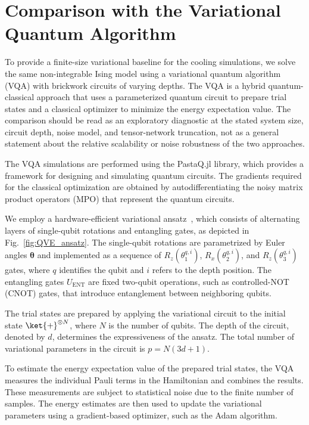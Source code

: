 \section{Comparison with the Variational Quantum Algorithm}

To provide a finite-size variational baseline for the cooling simulations, we solve the same non-integrable Ising model using a variational quantum algorithm (VQA) with brickwork circuits of varying depths. The VQA is a hybrid quantum-classical approach that uses a parameterized quantum circuit to prepare trial states and a classical optimizer to minimize the energy expectation value. The comparison should be read as an exploratory diagnostic at the stated system size, circuit depth, noise model, and tensor-network truncation, not as a general statement about the relative scalability or noise robustness of the two approaches.

The VQA simulations are performed using the PastaQ.jl library, which provides a framework for designing and simulating quantum circuits. The gradients required for the classical optimization are obtained by autodifferentiating the noisy matrix product operators (MPO) that represent the quantum circuits.

We employ a hardware-efficient variational ansatz~\citep{Kandala2017Hardwareefficient}, which consists of alternating layers of single-qubit rotations and entangling gates, as depicted in Fig.~\ref{fig:QVE_ansatz}. The single-qubit rotations are parametrized by Euler angles $\mathbf{\theta}$ and implemented as a sequence of $R_z(\theta_1^{q,i})$, $R_x(\theta_2^{q,i})$, and $R_z(\theta_3^{q,i})$ gates, where $q$ identifies the qubit and $i$ refers to the depth position. The entangling gates $U_{\text{ENT}}$ are fixed two-qubit operations, such as controlled-NOT (CNOT) gates, that introduce entanglement between neighboring qubits.

The trial states are prepared by applying the variational circuit to the initial state $\ket{+}^{\otimes N}$, where $N$ is the number of qubits. The depth of the circuit, denoted by $d$, determines the expressiveness of the ansatz. The total number of variational parameters in the circuit is $p=N(3d+1)$.

To estimate the energy expectation value of the prepared trial states, the VQA measures the individual Pauli terms in the Hamiltonian and combines the results. These measurements are subject to statistical noise due to the finite number of samples. The energy estimates are then used to update the variational parameters using a gradient-based optimizer, such as the Adam algorithm.


